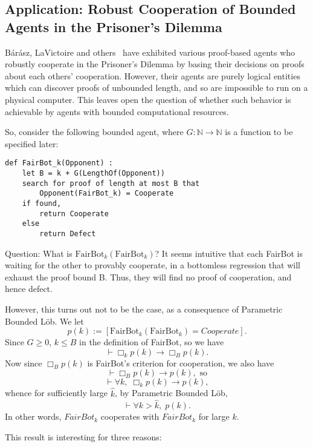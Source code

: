 \documentclass[onecolumn]{miri-tech-article}
\numberwithin{equation}{section}
\theoremstyle{definition}
\newcommand{\NN}{\mathbb{N}}
\newcommand{\proves}[1]{\underset{#1}{\vdash}}
\newcommand{\bx}[1]{\Box_{#1}}
\renewcommand{\implies}{\rightarrow}
\renewcommand{\to}{\rightarrow}
\renewcommand{\-}{^{-1}}
\newcommand{\FB}{\mathrm{FairBot}}
\begin{document}
\subsection{Application: Robust Cooperation of Bounded Agents in the Prisoner's Dilemma}
\label{sec:robucoop}

B\'{a}r\'{a}sz, LaVictoire and others~\cite{Barasz:2014:RobustCooperation}\cite{LaVictoire:2014:PrisDilemmaLob} have exhibited various proof-based agents who robustly cooperate in the Prisoner's Dilemma by basing their decisions on proofs about each others' cooperation.  However, their agents are purely logical entities which can discover proofs of unbounded length, and so are impossible to run on a physical computer.  This leaves open the question of whether such behavior is achievable by agents with bounded computational resources.

So, consider the following bounded agent, where $G:\NN\to\NN$ is a function to be specified later:

\begin{Verbatim}[frame=single]
def FairBot_k(Opponent) :
	let B = k + G(LengthOf(Opponent))
	search for proof of length at most B that 
		Opponent(FairBot_k) = Cooperate
	if found,
		return Cooperate
	else
		return Defect
\end{Verbatim}

Question: What is $\FB_k(\FB_k)$?  It seems intuitive that each FairBot is waiting for the other to provably cooperate, in a bottomless regression that will exhaust the proof bound B.  Thus, they will find no proof of cooperation, and hence defect.  

However, this turns out not to be the case, as a consequence of Parametric Bounded L\"{o}b.  We let $$p(k) := [\FB_k(\FB_k) = Cooperate].$$
Since $G\geq 0$, $k \leq B$ in the definition of FairBot, so we have 
$$\proves{} \bx{k}p(k) \implies \bx{B}p(k).$$
Now since $\bx{B}p(k)$ is FairBot's criterion for cooperation, we also have 
$$\proves{} \bx{B}p(k) \implies p(k), \textrm{ \ so}$$ 
$$\proves{} \forall k, \; \bx{k} p(k) \implies p(k),$$
whence for sufficiently large $\hat k$, by Parametric Bounded L\"{o}b,
$$\proves{} \forall k>\hat k,\; p(k).$$
In other words, $FairBot_k$ cooperates with $FairBot_k$ for large $k$.  

This result is interesting for three reasons:
\end{document}
